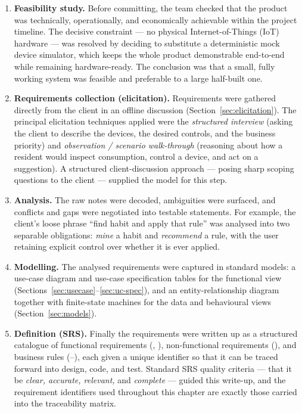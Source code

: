 \begin{enumerate}
  \item \textbf{Feasibility study.} Before committing, the team checked that the
  product was technically, operationally, and economically achievable within the
  project timeline. The decisive constraint --- no physical Internet-of-Things (IoT)
  hardware --- was resolved by deciding to substitute a deterministic mock device
  simulator, which keeps the whole product demonstrable end-to-end while remaining
  hardware-ready. The conclusion was that a small, fully working system was feasible
  and preferable to a large half-built one.
  \item \textbf{Requirements collection (elicitation).} Requirements were gathered
  directly from the client in an offline discussion (Section~\ref{sec:elicitation}).
  The principal elicitation techniques applied were the \emph{structured interview}
  (asking the client to describe the devices, the desired controls, and the business
  priority) and \emph{observation / scenario walk-through} (reasoning about how a
  resident would inspect consumption, control a device, and act on a suggestion). A
  structured client-discussion approach --- posing sharp scoping questions to the
  client --- supplied the model for this step.
  \item \textbf{Analysis.} The raw notes were decoded, ambiguities were surfaced, and
  conflicts and gaps were negotiated into testable statements. For example, the
  client's loose phrase ``find habit and apply that rule'' was analysed into two
  separable obligations: \emph{mine} a habit and \emph{recommend} a rule, with the
  user retaining explicit control over whether it is ever applied.
  \item \textbf{Modelling.} The analysed requirements were captured in standard
  models: a use-case diagram and use-case specification tables for the functional
  view (Sections~\ref{sec:usecase}--\ref{sec:uc-spec}), and an
  entity-relationship diagram together with finite-state machines for the data and
  behavioural views (Section~\ref{sec:models}).
  \item \textbf{Definition (SRS).} Finally the requirements were written up as a
  structured catalogue of functional requirements (, ),
  non-functional requirements (), and business rules (--),
  each given a unique identifier so that it can be traced forward into design, code,
  and test. Standard SRS quality criteria --- that it be \emph{clear, accurate,
  relevant,} and \emph{complete} --- guided this write-up, and the requirement
  identifiers used throughout this chapter are exactly those carried into the
  traceability matrix.
\end{enumerate}

